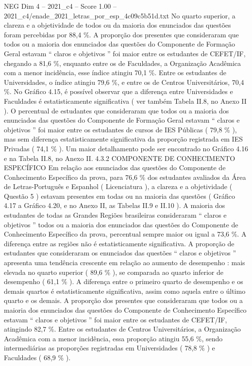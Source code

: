 \begin{textsample}{NEG Dim 4 – 2021\_c4 – Score 1.00 – 2021\_c4/enade\_2021\_letras\_por\_esp\_4c09c5b51d.txt}
No quarto superior, a clareza e a objetividade de todos ou da maioria dos enunciados das questões foram percebidas por 88,4 \%.
A proporção dos presentes que consideraram que todos ou a maioria dos enunciados das questões do Componente de Formação Geral estavam “ claros e objetivos ” foi maior entre os estudantes de CEFET/IF, chegando a 81,6 \%, enquanto entre os de Faculdades, a Organização Acadêmica com a menor incidência, esse índice atingiu 70,1 \%.
Entre os estudantes de Universidades, o índice atingiu 79,6 \%, e entre os de Centros Universitários, 70,4 \%.
No Gráfico 4.15, é possível observar que a diferença entre Universidades e Faculdades é estatisticamente significativa ( ver também Tabela II.8, no Anexo II ).
O percentual de estudantes que consideraram que todos ou a maioria dos enunciados das questões do Componente de Formação Geral estavam “ claros e objetivos ” foi maior entre os estudantes de cursos de IES Públicas ( 79,8 \% ), mas sem diferença estatisticamente significativa da proporção registrada em IES Privadas ( 74,1 \% ).
Um maior detalhamento pode ser encontrado no Gráfico 4.16 e na Tabela II.8, no Anexo II. 4.3.2 COMPONENTE DE CONHECIMENTO ESPECÍFICO Em relação aos enunciados das questões do Componente de Conhecimento Específico da prova, para 76,6 \% dos estudantes avaliados da Área de Letras-Português e Espanhol ( Licenciatura ), a clareza e a objetividade ( Questão 5 ) estavam presentes em todas ou na maioria das questões ( Gráfico 4.17 a Gráfico 4.20, e no Anexo II, as Tabelas II.9 e II.10 ).
A maioria dos estudantes de todas as Grandes Regiões brasileiras consideraram “ claros e objetivos ” todos ou a maioria dos enunciados das questões do Componente de Conhecimento Específico da prova, percentual sempre maior ou igual a 73,6 \%.
A diferença entre as regiões não é estatisticamente significativa.
A proporção de estudantes que consideraram os enunciados das questões “ claros e objetivos ” apresenta uma tendência crescente em relação ao aumento de desempenho : mais elevada no quarto superior ( 89,6 \% ), se comparada ao quarto inferior de desempenho ( 61,1 \% ).
A diferença entre o primeiro quarto de desempenho e os demais quartos é estatisticamente significativa, assim como aquela entre o último quarto e os demais.
A proporção dos presentes que consideraram que todos ou a maioria dos enunciados das questões do Componente de Conhecimento Específico estavam “ claros e objetivos ” foi maior entre os estudantes de CEFET/IF, atingindo 82,7 \%.
Entre os estudantes de Centros Universitários, a Organização Acadêmica com a menor incidência, essa proporção atingiu 55,6 \%, sendo intermediárias as proporções registradas em Universidades ( 78,8 \% ) e Faculdades ( 68,9 \% ).

\end{textsample}
